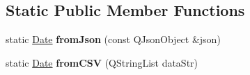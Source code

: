 \subsection*{Static Public Member Functions}
\begin{DoxyCompactItemize}
\item 
\hypertarget{class_date_a8293b8479ca66de81e95c65416947983}{static \hyperlink{class_date}{Date} {\bfseries from\-Json} (const Q\-Json\-Object \&json)}\label{class_date_a8293b8479ca66de81e95c65416947983}

\item 
\hypertarget{class_date_a7068fa3dceb4f28588a24deeb359d948}{static \hyperlink{class_date}{Date} {\bfseries from\-C\-S\-V} (Q\-String\-List data\-Str)}\label{class_date_a7068fa3dceb4f28588a24deeb359d948}

\end{DoxyCompactItemize}
